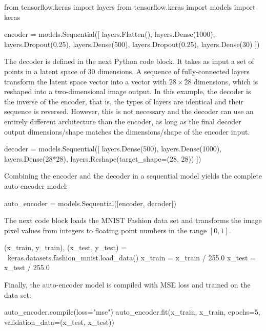 \begin{pythoncode}
from tensorflow.keras import layers
from tensorflow.keras import models
import keras

encoder = models.Sequential([
    layers.Flatten(),
    layers.Dense(1000),
    layers.Dropout(0.25),
    layers.Dense(500),
    layers.Dropout(0.25),
    layers.Dense(30)
])
\end{pythoncode}

The decoder is defined in the next Python code block. It takes as input a set of points in a latent space of $30$ dimensions. A sequence of fully-connected layers transform the latent space vector into a vector with $28 \times 28$ dimensions, which is reshaped into a two-dimensional image output. In this example, the decoder is the inverse of the encoder, that is, the types of layers are identical and their sequence is reversed. However, this is not necessary and the decoder can use an entirely different architecture than the encoder, as long as the final decoder output dimensions/shape matches the dimensions/shape of the encoder input.

\begin{pythoncode}
decoder = models.Sequential([
    layers.Dense(500),
    layers.Dense(1000),
    layers.Dense(28*28),
    layers.Reshape(target_shape=(28, 28))
])
\end{pythoncode}

Combining the encoder and the decoder in a sequential model yields the complete auto-encoder model:

\begin{pythoncode}
auto_encoder = models.Sequential([encoder, decoder])
\end{pythoncode}

The next code block loads the MNIST Fashion data set and transforms the image pixel values from integers to floating point numbers in the range $[0,1]$.

\begin{pythoncode}
(x_train, y_train), (x_test, y_test) = \
                    keras.datasets.fashion_mnist.load_data()
x_train = x_train / 255.0
x_test = x_test / 255.0
\end{pythoncode}

Finally, the auto-encoder model is compiled with MSE loss and trained on the data set:

\begin{pythoncode}
auto_encoder.compile(loss="mse")
auto_encoder.fit(x_train, x_train, 
                 epochs=5, validation_data=(x_test, x_test))
\end{pythoncode}

